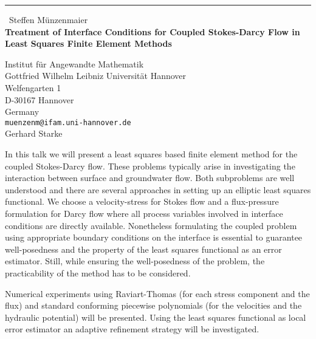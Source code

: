 \documentclass{report}
\begin{document}
\begin{center}
\rule{6in}{1pt} \
{\large Steffen M\"unzenmaier \\
{\bf Treatment of Interface Conditions for Coupled Stokes-Darcy Flow in Least Squares Finite Element Methods}}

Institut f\"ur Angewandte Mathematik \\ Gottfried Wilhelm Leibniz Universit\"at Hannover \\ Welfengarten 1 \\ D-30167 Hannover \\ Germany
\\
{\tt muenzenm@ifam.uni-hannover.de}\\
Gerhard Starke\end{center}

In this talk we will present a least squares based finite element method
for the coupled Stokes-Darcy flow. These problems typically arise in
investigating the interaction between surface and groundwater flow. Both
subproblems are well understood and there are several approaches in
setting up an elliptic least squares functional. We choose a
velocity-stress for Stokes flow and a flux-pressure formulation for Darcy
flow where all process variables involved in interface conditions are
directly available. Nonetheless formulating the coupled problem using
appropriate boundary conditions on the interface is essential to
guarantee well-posedness and the property of the least squares functional
as an error estimator. Still, while ensuring the well-posedness of the
problem, the practicability of the method has to be considered.

Numerical experiments using Raviart-Thomas (for each stress component and
the flux) and standard conforming piecewise polynomials (for the
velocities and the hydraulic potential) will be presented. Using the
least squares functional as local error estimator an adaptive refinement
strategy will be investigated.
\end{document}
